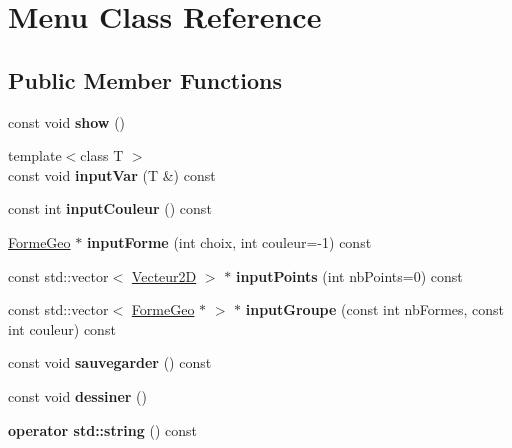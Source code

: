 \hypertarget{class_menu}{}\section{Menu Class Reference}
\label{class_menu}
\subsection*{Public Member Functions}
\begin{DoxyCompactItemize}
\item 
\mbox{\label{class_menu_a29b37a4dceb82d7bf8c4a37c40dd6647}} 
const void {\bfseries show} ()
\item 
\mbox{\label{class_menu_a8cf1d29a2d87b305fee18718cd1deb44}} 
{\footnotesize template$<$class T $>$ }\\const void {\bfseries input\+Var} (T \&) const
\item 
\mbox{\label{class_menu_a1e4940e6cb9111d53abac46fbde56f6f}} 
const int {\bfseries input\+Couleur} () const
\item 
\mbox{\label{class_menu_ad5a31147e95c2570a69ef04d2e243e69}} 
\mbox{\hyperlink{class_forme_geo}{Forme\+Geo}} $\ast$ {\bfseries input\+Forme} (int choix, int couleur=-\/1) const
\item 
\mbox{\label{class_menu_aa1f9310bc9d7a91b62e4517a365f59af}} 
const std\+::vector$<$ \mbox{\hyperlink{class_vecteur2_d}{Vecteur2D}} $>$ $\ast$ {\bfseries input\+Points} (int nb\+Points=0) const
\item 
\mbox{\label{class_menu_a1376d1cf2db34b98df4230b67a273633}} 
const std\+::vector$<$ \mbox{\hyperlink{class_forme_geo}{Forme\+Geo}} $\ast$ $>$ $\ast$ {\bfseries input\+Groupe} (const int nb\+Formes, const int couleur) const
\item 
\mbox{\label{class_menu_ae3546f4a69ec75a7209fbe82cb36329e}} 
const void {\bfseries sauvegarder} () const
\item 
\mbox{\label{class_menu_a6922ea391429f1cb750cc1eadad5f07c}} 
const void {\bfseries dessiner} ()
\item 
\mbox{\label{class_menu_a47a94c8a6820d2d7651402bcf7ee2691}} 
{\bfseries operator std\+::string} () const
\end{DoxyCompactItemize}
